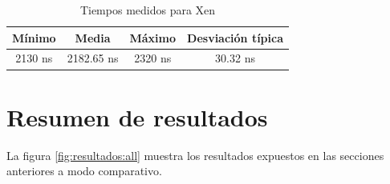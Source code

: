 \begin{table}[!ht]
  \centering
	\begin{tabular}{ |c|c|c|c| }
		\hline
    Mínimo          & Media      & Máximo  & Desviación típica  \\
    \hline
    2130 ns         &  2182.65 ns     & 2320 ns    & 30.32 ns	   \\
    \hline
	\end{tabular}
	\caption{Tiempos medidos para Xen}
  \label{table:results_xen}
\end{table}

\section{Resumen de resultados}

La figura \ref{fig:resultados:all} muestra los resultados expuestos en las secciones anteriores a modo comparativo.\\

\mydatabig

\mydatadesv

